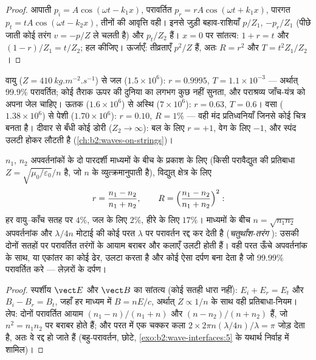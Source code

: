 \begin{proof}
आपाती $p_i = A\cos(\omega t - k_1x)$, परावर्तित $p_r = rA\cos(\omega t + k_1x)$,
पारगत $p_t = tA\cos(\omega t - k_2x)$, तीनों की आवृत्ति वही। इनसे जुड़ी
बहाव-राशियाँ $p/Z_1$, $-p_r/Z_1$ (पीछे जाती कोई तरंग
$v = -p/Z$ ले चलती है) और $p_t/Z_2$ हैं। $x = 0$ पर सांतत्य: $1 + r = t$ और $(1 - r)/Z_1
= t/Z_2$; हल कीजिए। ऊर्जाएँ: तीव्रताएँ $p^2/Z$ हैं, अतः $R = r^2$ और
$T = t^2Z_1/Z_2$।
\end{proof}

\begin{example}[तीन अंतरापृष्ठों पर ध्वनि]\label{ex:b2:wave-interfaces:sound}
वायु ($Z = \qty{410}{kg.m^{-2}.s^{-1}}$) से जल ($1.5 \times 10^6$): $r = 0.9995$,
$T = 1.1 \times 10^{-3}$ --- अर्थात् $99.9\%$ परावर्तित; कोई तैराक ऊपर की दुनिया का
लगभग कुछ नहीं सुनता, और पराश्रव्य जाँच-यंत्र को अपना जेल चाहिए। ऊतक
($1.6 \times 10^6$) से अस्थि ($7 \times 10^6$): $r = 0.63$, $T = 0.6$। वसा ($1.38 \times
10^6$) से पेशी ($1.70 \times 10^6$): $r = 0.10$, $R = 1\%$ --- वही मंद प्रतिध्वनियाँ जिनसे
कोई चित्र बनता है। दीवार से बँधी कोई डोरी ($Z_2 \to \infty$): बल के लिए $r = +1$,
वेग के लिए $-1$, और स्पंद उलटी होकर लौटती है
(\cref{ch:b2:waves-on-strings})।
\end{example}

\begin{proposition}[अभिलंब आपतन पर प्रकाश; परावर्तन-रोधी लेप]\label{prop:b2:wave-interfaces:optics}
$n_1$, $n_2$ अपवर्तनांकों के दो पारदर्शी माध्यमों के बीच के प्रकाश के लिए (किसी
परावैद्युत की प्रतिबाधा $Z = \sqrt{\mu_0/\varepsilon_0}/n$ है, जो
$n$ के व्युत्क्रमानुपाती है), विद्युत् क्षेत्र के लिए
\[
r = \frac{n_1 - n_2}{n_1 + n_2} , \qquad R = \Bigl(\frac{n_1 - n_2}{n_1 + n_2}\Bigr)^2 :
\]
हर वायु--काँच सतह पर $4\%$, जल के लिए $2\%$, हीरे के लिए $17\%$। माध्यमों के बीच
$n = \sqrt{n_1n_2}$ अपवर्तनांक और $\lambda/4n$ मोटाई की कोई परत
$\lambda$ पर परावर्तन रद्द कर देती है (\emph{चतुर्थांश-तरंग }): उसकी दोनों सतहों पर परावर्तित तरंगों के आयाम बराबर
और कलाएँ उलटी होती हैं। वही परत ऊँचे अपवर्तनांक के साथ, या
एकांतर  का कोई ढेर, उलटा करता है और कोई ऐसा
दर्पण बना देता है जो $99.99\%$ परावर्तित करे --- लेज़रों के दर्पण।
\end{proposition}

\begin{proof}
स्पर्शीय $\vect E$ और $\vect B$ का सांतत्य (कोई सतही
धारा नहीं): $E_i + E_r = E_t$ और $B_i - B_r = B_t$, जहाँ हर माध्यम में $B = nE/c$,
अर्थात् $Z \propto 1/n$ के साथ वही प्रतिबाधा-नियम। लेप: दोनों
परावर्तित आयाम $(n_1 - n)/(n_1 + n)$ और $(n - n_2)/(n + n_2)$ हैं,
जो $n^2 = n_1n_2$ पर बराबर होते हैं; और परत में एक चक्कर कला
$2\times2\pi n(\lambda/4n)/\lambda = \pi$ जोड़ देता है, अतः वे रद्द हो जाते हैं (बहु-परावर्तन,
छोटे, \cref{exo:b2:wave-interfaces:5} के यथार्थ निर्वाह में शामिल)।
\end{proof}

